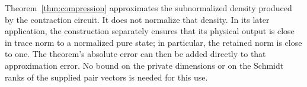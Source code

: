 \begin{remark}
\label{rem:compression-retained-norm}
Theorem~\ref{thm:compression} approximates the subnormalized density
produced by the contraction circuit.  It does not normalize that
density.  In its later application, the construction separately ensures
that its physical output is close in trace norm to a normalized pure
state; in particular, the retained norm is close to one.  The theorem's
absolute error can then be added directly to that approximation error.
No bound on the private dimensions or on the Schmidt ranks of the
supplied pair vectors is needed for this use.
\end{remark}
